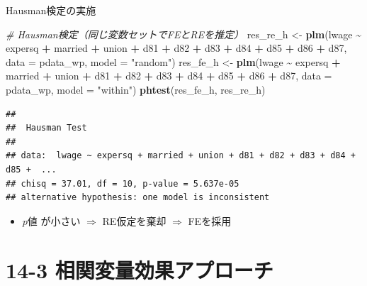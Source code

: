 \documentclass[
  ignorenonframetext,
]{beamer}
\newenvironment{Shaded}{\begin{snugshade}}{\end{snugshade}}
\newcommand{\AttributeTok}[1]{\textcolor[rgb]{0.13,0.29,0.53}{#1}}
\newcommand{\CommentTok}[1]{\textcolor[rgb]{0.56,0.35,0.01}{\textit{#1}}}
\newcommand{\FunctionTok}[1]{\textcolor[rgb]{0.13,0.29,0.53}{\textbf{#1}}}
\newcommand{\NormalTok}[1]{#1}
\newcommand{\OtherTok}[1]{\textcolor[rgb]{0.56,0.35,0.01}{#1}}
\newcommand{\SpecialCharTok}[1]{\textcolor[rgb]{0.81,0.36,0.00}{\textbf{#1}}}
\newcommand{\StringTok}[1]{\textcolor[rgb]{0.31,0.60,0.02}{#1}}
\providecommand{\tightlist}{%
  \setlength{\itemsep}{0pt}\setlength{\parskip}{0pt}}
\begin{document}
\begin{frame}[fragile]{Hausman検定の実施}
\label{hausmanux691cux5b9aux306eux5b9fux65bd}
\footnotesize

\begin{Shaded}
\begin{Highlighting}[]
\CommentTok{\# Hausman検定（同じ変数セットでFEとREを推定）}
\NormalTok{res\_re\_h }\OtherTok{\textless{}{-}} \FunctionTok{plm}\NormalTok{(lwage }\SpecialCharTok{\textasciitilde{}}\NormalTok{ expersq }\SpecialCharTok{+}\NormalTok{ married }\SpecialCharTok{+}\NormalTok{ union }\SpecialCharTok{+}
\NormalTok{                  d81 }\SpecialCharTok{+}\NormalTok{ d82 }\SpecialCharTok{+}\NormalTok{ d83 }\SpecialCharTok{+}\NormalTok{ d84 }\SpecialCharTok{+}\NormalTok{ d85 }\SpecialCharTok{+}\NormalTok{ d86 }\SpecialCharTok{+}\NormalTok{ d87,}
                \AttributeTok{data =}\NormalTok{ pdata\_wp, }\AttributeTok{model =} \StringTok{"random"}\NormalTok{)}
\NormalTok{res\_fe\_h }\OtherTok{\textless{}{-}} \FunctionTok{plm}\NormalTok{(lwage }\SpecialCharTok{\textasciitilde{}}\NormalTok{ expersq }\SpecialCharTok{+}\NormalTok{ married }\SpecialCharTok{+}\NormalTok{ union }\SpecialCharTok{+}
\NormalTok{                  d81 }\SpecialCharTok{+}\NormalTok{ d82 }\SpecialCharTok{+}\NormalTok{ d83 }\SpecialCharTok{+}\NormalTok{ d84 }\SpecialCharTok{+}\NormalTok{ d85 }\SpecialCharTok{+}\NormalTok{ d86 }\SpecialCharTok{+}\NormalTok{ d87,}
                \AttributeTok{data =}\NormalTok{ pdata\_wp, }\AttributeTok{model =} \StringTok{"within"}\NormalTok{)}
\FunctionTok{phtest}\NormalTok{(res\_fe\_h, res\_re\_h)}
\end{Highlighting}
\end{Shaded}

\begin{verbatim}
## 
##  Hausman Test
## 
## data:  lwage ~ expersq + married + union + d81 + d82 + d83 + d84 + d85 +  ...
## chisq = 37.01, df = 10, p-value = 5.637e-05
## alternative hypothesis: one model is inconsistent
\end{verbatim}

\normalsize

\begin{itemize}
\tightlist
\item
  \(p値\) が小さい \(\Rightarrow\) RE仮定を棄却 \(\Rightarrow\) FEを採用
\end{itemize}
\end{frame}

\section{14-3
相関変量効果アプローチ}\label{ux76f8ux95a2ux5909ux91cfux52b9ux679cux30a2ux30d7ux30edux30fcux30c1}
\end{document}
